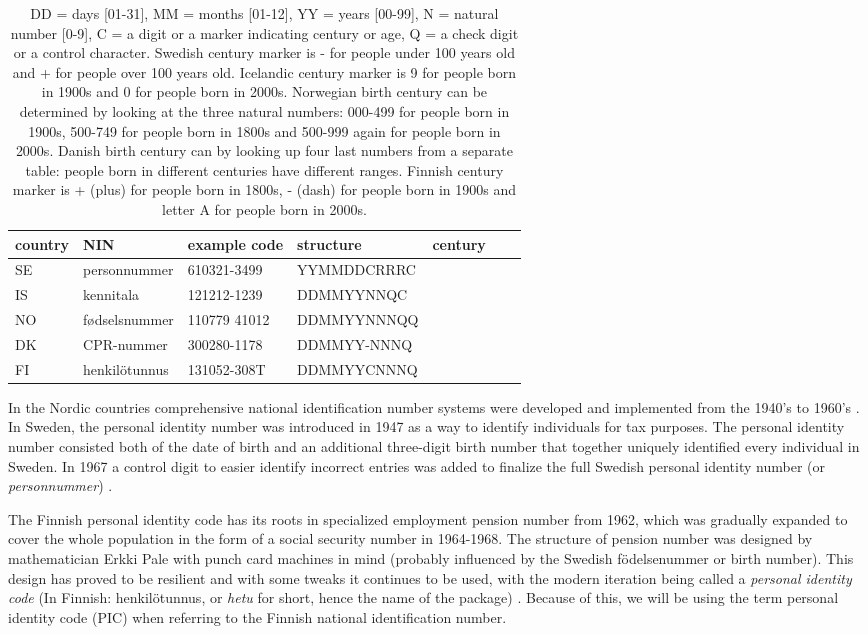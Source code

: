 \begin{table}[ht]
\centering
\begin{tabular}{lllllll}
\toprule
  country & NIN & example code & structure & century \\
  \hline
  SE & personnummer & 610321-3499 & YYMMDDCRRRC \\
  IS & kennitala & 121212-1239 & DDMMYYNNQC \\
  NO & fødselsnummer & 110779 41012 & DDMMYYNNNQQ \\
  DK & CPR-nummer & 300280-1178 & DDMMYY-NNNQ \\
  FI & henkilötunnus & 131052-308T & DDMMYYCNNNQ \\
\bottomrule
\end{tabular}
\caption{DD = days [01-31], MM = months [01-12], YY = years [00-99], N = natural number [0-9], C = a digit or a marker indicating century or age, Q = a check digit or a control character. Swedish century marker is - for people under 100 years old and + for people over 100 years old. Icelandic century marker is 9 for people born in 1900s and 0 for people born in 2000s. Norwegian birth century can be determined by looking at the three natural numbers: 000-499 for people born in 1900s, 500-749 for people born in 1800s and 500-999 again for people born in 2000s. Danish birth century can by looking up four last numbers from a separate table: people born in different centuries have different ranges. Finnish century marker is + (plus) for people born in 1800s, - (dash) for people born in 1900s and letter A for people born in 2000s.}
\label{tab:nordiccomparison2}
\end{table}

In the Nordic countries comprehensive national identification number systems were developed and implemented from the 1940's to 1960's \citep{watson2010}. In Sweden, the personal identity number was introduced in 1947 as a way to identify individuals for tax purposes. The personal identity number consisted both of the date of birth and an additional three-digit birth number that together uniquely identified every individual in Sweden. In 1967 a control digit to easier identify incorrect entries was added to finalize the full Swedish personal identity number (or \emph{personnummer}) \citep{johansson2003,scb2016}.

The Finnish personal identity code has its roots in specialized employment pension number from 1962, which was gradually expanded to cover the whole population in the form of a social security number in 1964-1968. The structure of pension number was designed by mathematician Erkki Pale with punch card machines in mind (probably influenced by the Swedish födelsenummer or birth number). This design has proved to be resilient and with some tweaks it continues to be used, with the modern iteration being called a \emph{personal identity code} (In Finnish: henkilötunnus, or \emph{hetu} for short, hence the name of the package) \citep{salste2021}. Because of this, we will be using the term personal identity code (PIC) when referring to the Finnish national identification number.

